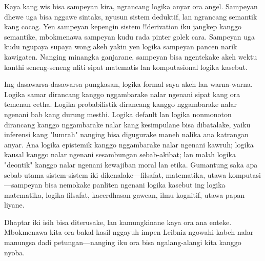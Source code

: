 \documentclass[../../../include/open-logic-section]{subfiles}
\begin{document}


Kaya kang wis bisa sampeyan kira,
ngrancang logika anyar ora angel.
Sampeyan dhewe uga bisa nggawe
sintaks, nyusun sistem deduktif,
lan ngrancang semantik kang cocog.
Yen sampeyan kepengin sistem
!!{derivation} iku jangkep kanggo
semantike, mbokmenawa sampeyan
kudu rada pinter golek cara.
Sampeyan uga kudu ngupaya
supaya wong akeh yakin yen
logika sampeyan pancen narik
kawigaten. Nanging minangka
ganjarane, sampeyan bisa
ngentekake akeh wektu kanthi
seneng-seneng nliti sipat
matematis lan komputasional
logika kasebut.

Ing dasawarsa-dasawarsa pungkasan,
logika formal saya akeh lan
warna-warna. Logika samar
dirancang kanggo nggambarake
nalar ngenani sipat kang ora
temenan cetha. Logika
probabilistik dirancang
kanggo nggambarake nalar
ngenani bab kang durung mesthi.
Logika default lan logika
nonmonoton dirancang kanggo
nggambarake nalar kang
kesimpulane bisa dibatalake,
yaiku inferensi kang "lumrah"
nanging bisa digugurake maneh
nalika ana katrangan anyar.
Ana logika epistemik kanggo
nggambarake nalar ngenani
kawruh; logika kausal
kanggo nalar ngenani
sesambungan sebab-akibat;
lan malah logika "deontik"
kanggo nalar ngenani
kewajiban moral lan etika.
Gumantung saka apa sebab
utama sistem-sistem iki
dikenalake---filsafat,
matematika, utawa
komputasi---sampeyan bisa
nemokake panliten ngenani
logika kasebut ing
logika matematika,
logika filsafat,
kacerdhasan gawean,
ilmu kognitif,
utawa papan liyane.

Dhaptar iki isih bisa
diterusake, lan kamungkinane
kaya ora ana enteke.
Mbokmenawa kita ora bakal
kasil nggayuh impen Leibniz
ngowahi kabeh nalar manungsa
dadi petungan---nanging
iku ora bisa ngalang-alangi
kita kanggo nyoba.
\end{document}
